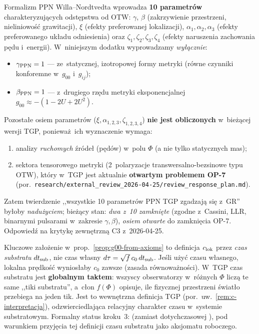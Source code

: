 \begin{remark}%
\label{rem:PPN-scope-2026}
Formalizm PPN Willa--Nordtvedta wprowadza \textbf{10 parametr\'ow}
charakteryzuj\k{a}cych odst\k{e}pstwa od OTW: $\gamma$, $\beta$
(zakrzywienie przestrzeni, nieliniowo\'s\'c grawitacji),
$\xi$ (efekty preferowanej lokalizacji), $\alpha_1,\alpha_2,\alpha_3$
(efekty preferowanego uk\l{}adu odniesienia) oraz
$\zeta_1,\zeta_2,\zeta_3,\zeta_4$ (efekty naruszenia zachowania
p\k{e}du i~energii). W~niniejszym dodatku wyprowadzamy
\emph{wy\l{}\k{a}cznie}:
\begin{itemize}[nosep]
  \item $\gamma_{\rm PPN} = 1$ --- ze~statycznej, izotropowej
    formy metryki (r\'owne czynniki konforemne w~$g_{00}$
    i~$g_{ij}$);
  \item $\beta_{\rm PPN} = 1$ --- z~drugiego rz\k{e}du metryki
    eksponencjalnej $g_{00} \approx -(1 - 2U + 2U^2)$.
\end{itemize}
Pozosta\l{}e osiem parametr\'ow ($\xi, \alpha_{1,2,3},
\zeta_{1,2,3,4}$) \textbf{nie jest obliczonych} w~bie\.z\k{a}cej
wersji TGP, poniewa\.z~ich wyznaczenie wymaga:
\begin{enumerate}[nosep]
  \item analizy \emph{ruchomych} \'zr\'ode\l{} (p\k{e}d\'ow)
    w~polu $\Phi$ (a nie tylko statycznych mas);
  \item sektora tensorowego metryki (2~polaryzacje
    transwersalno-bezsinowe typu OTW), kt\'ory w~TGP jest
    aktualnie \textbf{otwartym problemem OP-7} (por.\
    \texttt{research/external\_review\_2026-04-25/review\_response\_plan.md}).
\end{enumerate}
Zatem twierdzenie ,,wszystkie 10 parametr\'ow PPN TGP zgadzaj\k{a}
si\k{e} z~GR'' by\l{}oby \emph{nadu\.zyciem}; bie\.z\k{a}cy stan:
\emph{dwa z~10 zamkni\k{e}te} (zgodne z~Cassini, LLR, binarnymi
pulsarami w~zakresie $\gamma, \beta$), \emph{osiem otwarte}
do zamkni\k{e}cia OP-7. Odpowied\'z na krytyk\k{e} zewn\k{e}trzn\k{a}
C3 z~2026-04-25.
\end{remark}

\begin{remark}%
\label{rem:substrate-time}
Kluczowe za\l{}o\.zenie w~prop.~\ref{prop:g00-from-axioms} to
definicja $c_{\rm lok}$ przez \emph{czas substratu} $dt_{\rm sub}$,
nie czas w\l{}asny $d\tau = \sqrt{f}\,c_0\,dt_{\rm sub}$.
Je\'sli u\.zy\'c czasu w\l{}asnego, lokalna pr\k{e}dko\'s\'c
wynios\l{}aby $c_0$ zawsze (zasada r\'ownowa\.zno\'sci).
W~TGP czas substratu jest \textbf{globalnym taktem}:
wszyscy obserwatorzy w~r\'o\.znych $\Phi$ licz\k{a} te same
,,tiki substratu'', a~c\l{}on $f(\Phi)$ opisuje,
ile fizycznej przestrzeni \'swiat\l{}o przebiega na jeden tik.
Jest to wewn\k{e}trzna definicja TGP (por.\ uw.~\ref{rem:c-interpretacja}),
odzwierciedlaj\k{a}ca relacyjny charakter czasu w~systemie substratowym.
Formalny status kroku~3: \statuslabel{Propozycja}
(zamiast dotychczasowej ),
pod warunkiem przyj\k{e}cia tej definicji czasu substratu
jako aksjomatu roboczego.
\end{remark}

